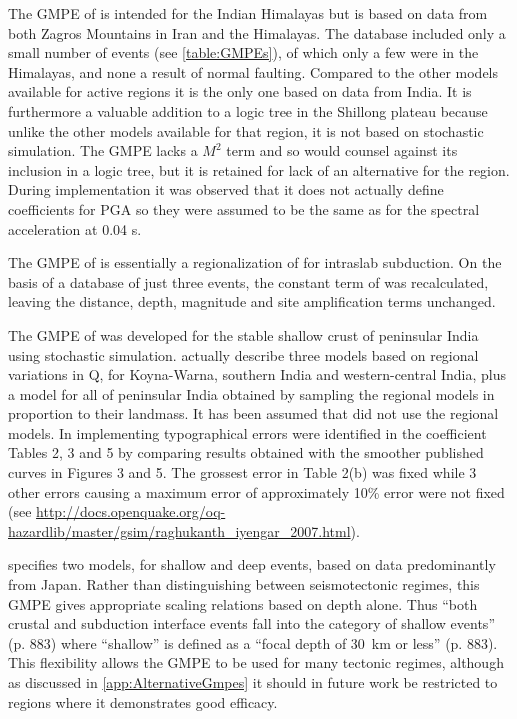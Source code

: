 \documentclass{article}
\begin{document}
The GMPE of \cite{sharma2009ground} is intended for the Indian Himalayas but is based on data from both Zagros Mountains in Iran and the Himalayas.
The database included only a small number of events (see \autoref{table:GMPEs}), of which only a few were in the Himalayas, and none a result of normal faulting. 
Compared to the other models available for active regions it is the only one based on data from India.
It is furthermore a valuable addition to a logic tree in the Shillong plateau because unlike the other models available for that region, it is not based on stochastic simulation. The GMPE lacks a $M^2$ term and so \cite{cotton2006criteria} would counsel against its inclusion in a logic tree, but it is retained for lack of an alternative for the region. 
During implementation it was observed that it does not actually define coefficients for PGA so they were assumed to be the same as for the spectral acceleration at 0.04 s.

The GMPE of \cite{gupta2010response} is essentially a regionalization of \cite{atkinson2003empirical} for intraslab subduction. 
On the basis of a database of just three events, the constant term of \cite{atkinson2003empirical} was recalculated, leaving the distance, depth, magnitude and site amplification terms unchanged.

The GMPE of \cite{raghukanth2007estimation} was developed for the stable shallow crust of peninsular India using stochastic simulation.  
\cite{raghukanth2007estimation} actually describe three models based on regional variations in Q, for Koyna-Warna, southern India and western-central India, plus a model for all of peninsular India obtained by sampling the regional models in proportion to their landmass. 
It has been assumed that \cite{nath2012probabilistic} did not use the regional models. 
In implementing \cite{raghukanth2007estimation} typographical errors were identified in the coefficient Tables 2, 3 and 5 by comparing results obtained with the smoother published curves in Figures 3 and 5. 
The grossest error in Table 2(b) was fixed while 3 other errors causing a maximum error of approximately 10\% error were not fixed (see \url{ http://docs.openquake.org/oq-hazardlib/master/gsim/raghukanth_iyengar_2007.html}).

\cite{kanno2006new} specifies two models, for shallow and deep events, based on data predominantly from Japan. 
Rather than distinguishing between seismotectonic regimes, this GMPE gives appropriate scaling relations based on depth alone. 
Thus ``both crustal and subduction interface events fall into the category of shallow events'' (p. 883) where ``shallow'' is defined as a ``focal depth of 30~km or less'' (p. 883).
This flexibility allows the GMPE to be used for many tectonic regimes, although as discussed in \autoref{app:AlternativeGmpes} it should in future work be restricted to regions where it demonstrates good efficacy. 
\end{document}
